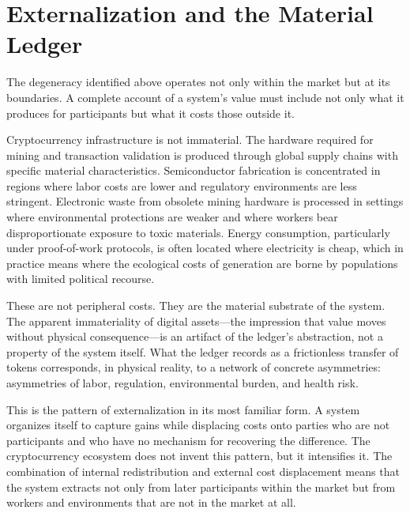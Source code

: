 \documentclass[12pt, oneside]{article}
\theoremstyle{definition}
\begin{document}
\section{Externalization and the Material Ledger}

The degeneracy identified above operates not only within the market but at its boundaries. A complete account of a system's value must include not only what it produces for participants but what it costs those outside it.

Cryptocurrency infrastructure is not immaterial. The hardware required for mining and transaction validation is produced through global supply chains with specific material characteristics. Semiconductor fabrication is concentrated in regions where labor costs are lower and regulatory environments are less stringent. Electronic waste from obsolete mining hardware is processed in settings where environmental protections are weaker and where workers bear disproportionate exposure to toxic materials. Energy consumption, particularly under proof-of-work protocols, is often located where electricity is cheap, which in practice means where the ecological costs of generation are borne by populations with limited political recourse.

These are not peripheral costs. They are the material substrate of the system. The apparent immateriality of digital assets---the impression that value moves without physical consequence---is an artifact of the ledger's abstraction, not a property of the system itself. What the ledger records as a frictionless transfer of tokens corresponds, in physical reality, to a network of concrete asymmetries: asymmetries of labor, regulation, environmental burden, and health risk.

This is the pattern of externalization in its most familiar form. A system organizes itself to capture gains while displacing costs onto parties who are not participants and who have no mechanism for recovering the difference. The cryptocurrency ecosystem does not invent this pattern, but it intensifies it. The combination of internal redistribution and external cost displacement means that the system extracts not only from later participants within the market but from workers and environments that are not in the market at all.
\end{document}
